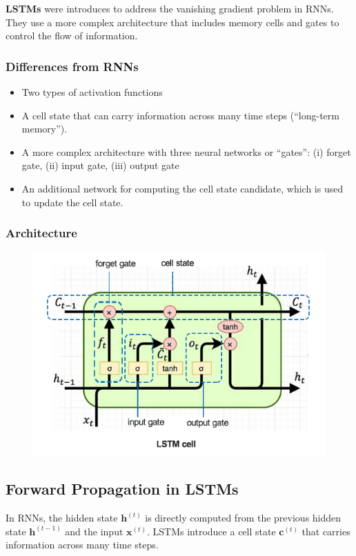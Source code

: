 \textbf{LSTMs} were introduces to address the vanishing gradient problem in RNNs. They use a more complex architecture that includes memory cells and gates to control the flow of information.

\subsubsection*{Differences from RNNs}
\begin{itemize}
  \item Two types of activation functions
  \item A cell state that can carry information across many time steps (\enquote{long-term memory}).
  \item A more complex architecture with three neural networks or \enquote{gates}: (i) forget gate, (ii) input gate, (iii) output gate
  \item An additional network for computing the cell state candidate, which is used to update the cell state.
\end{itemize}

\subsubsection*{Architecture}

\begin{figure}[H]
  \centering
  \includegraphics[width=\linewidth]{images/lstm.png}
\end{figure}

\subsection*{Forward Propagation in LSTMs}
In RNNs, the hidden state $\mathbf{h}^{(t)}$ is directly computed from the previous hidden state $\mathbf{h}^{(t-1)}$ and the input $\mathbf{x}^{(t)}$. LSTMs introduce a cell state $\mathbf{c}^{(t)}$ that carries information across many time steps.

